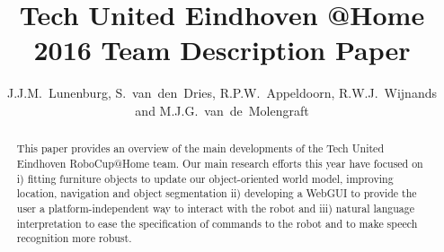 \documentclass[runningheads,a4paper]{llncs}
\begin{document}
\title{Tech United Eindhoven @Home 2016 Team Description Paper}
\author{J.J.M.~Lunenburg, S.~van~den~Dries, R.P.W.~Appeldoorn, R.W.J.~Wijnands and M.J.G.~van~de~Molengraft}

\maketitle



\begin{abstract}
This paper provides an overview of the main developments of the Tech United Eindhoven RoboCup@Home team. 
Our main research efforts this year have focused on i) fitting furniture objects to update our object-oriented world model, improving location, navigation and object segmentation ii) developing a WebGUI to provide the user a platform-independent way to interact with the robot and iii) natural language interpretation to ease the specification of commands to the robot and to make speech recognition more robust.
\end{abstract}
\end{document}
